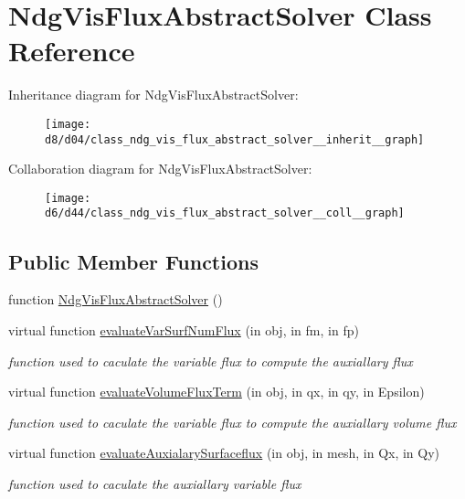 \hypertarget{class_ndg_vis_flux_abstract_solver}{}\section{Ndg\+Vis\+Flux\+Abstract\+Solver Class Reference}
\label{class_ndg_vis_flux_abstract_solver}


Inheritance diagram for Ndg\+Vis\+Flux\+Abstract\+Solver\+:
\nopagebreak
\begin{figure}[H]
\begin{center}
\leavevmode
\texttt{[image: d8/d04/class\_ndg\_vis\_flux\_abstract\_solver\_\_inherit\_\_graph]}
\end{center}
\end{figure}


Collaboration diagram for Ndg\+Vis\+Flux\+Abstract\+Solver\+:
\nopagebreak
\begin{figure}[H]
\begin{center}
\leavevmode
\texttt{[image: d6/d44/class\_ndg\_vis\_flux\_abstract\_solver\_\_coll\_\_graph]}
\end{center}
\end{figure}
\subsection*{Public Member Functions}
\begin{DoxyCompactItemize}
\item 
function \hyperlink{class_ndg_vis_flux_abstract_solver_a2a333a4d758e61119403fafe481b723f}{Ndg\+Vis\+Flux\+Abstract\+Solver} ()
\item 
virtual function \hyperlink{class_ndg_vis_flux_abstract_solver_a4f51a74540ffba28a09dba43f750a78e}{evaluate\+Var\+Surf\+Num\+Flux} (in obj, in fm, in fp)
\begin{DoxyCompactList}\small\item\em function used to caculate the variable flux to compute the auxiallary flux \end{DoxyCompactList}\item 
virtual function \hyperlink{class_ndg_vis_flux_abstract_solver_af24af3c5c34dcd33ec53b3dcdea092ed}{evaluate\+Volume\+Flux\+Term} (in obj, in qx, in qy, in Epsilon)
\begin{DoxyCompactList}\small\item\em function used to caculate the variable flux to compute the auxiallary volume flux \end{DoxyCompactList}\item 
virtual function \hyperlink{class_ndg_vis_flux_abstract_solver_a2c9b1f860b7e46dc3246bd84ac528201}{evaluate\+Auxialary\+Surfaceflux} (in obj, in mesh, in Qx, in Qy)
\begin{DoxyCompactList}\small\item\em function used to caculate the auxiallary variable flux \end{DoxyCompactList}\end{DoxyCompactItemize}


